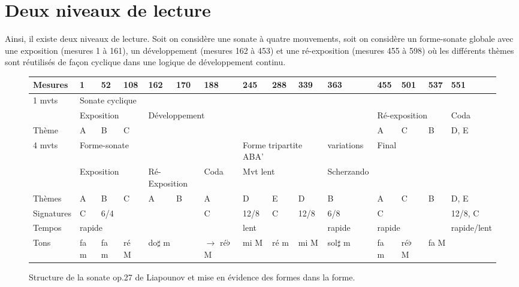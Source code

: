 \section{Deux niveaux de lecture}

Ainsi, il existe deux niveaux de lecture. Soit on considère une sonate à quatre mouvements, soit on considère un forme-sonate globale avec une exposition (mesures 1 à 161), un développement (mesures 162 à 453) et une ré-exposition (mesures 455 à 598) où les différents thèmes sont réutilisés de façon cyclique dans une logique de développement continu.

\begin{figure}[!p]
  \begin{bigcenter}
    \vspace{-1cm}
     {
      \scalebox{0.925} {
\begin{tabular}{|l|l|l|l|l|l|l|l|l|l|l|l|l|l|l|}
 \hline
   Mesures & 1 & 52 & 108 & 162 & 170 & 188 & 245 & 288 & 339 & 363 & 455 & 501 & 537 & 551 \\
 \hline
 \hline
   1 mvts & \multicolumn{14}{|l|}{Sonate cyclique}\\
 \hline
          & \multicolumn{3}{|l|}{Exposition} & \multicolumn{7}{l|}{Développement} & \multicolumn{3}{l|}{Ré-exposition} & Coda\\
 \hline
   Thème & A & B & C & \multicolumn{7}{l|}{} & A & C & B & D, E\\
 \hline
 \hline
   4 mvts & \multicolumn{6}{|l|}{Forme-sonate} & \multicolumn{3}{|l|}{Forme tripartite ABA'} & variations & \multicolumn{4}{|l|}{Final}\\
 \hline
          & \multicolumn{3}{|l|}{Exposition} & \multicolumn{2}{l|}{Ré-Exposition} & Coda & \multicolumn{3}{l|}{Mvt lent} & Scherzando & \multicolumn{4}{l|}{}\\
 \hline
  Thèmes & A & B & C & A & B & A & D & E & D & B & A & C & B & D, E\\
 \hline
 \hline
  Signatures & C & \multicolumn{4}{|l|}{6/4} & C & 12/8 & C & 12/8 & 6/8 & \multicolumn{3}{|l|}{C} & 12/8, C\\
 \hline
  Tempos & \multicolumn{6}{|l|}{rapide} & \multicolumn{3}{|l|}{lent} & rapide & \multicolumn{3}{|l|}{rapide} & rapide/lent\\
 \hline
  Tons & fa m & fa m & ré M & \multicolumn{2}{|l|}{do$\sharp$ m} & $\to$ ré$\flat$ M & mi M & ré m & mi M & sol$\sharp$ m & fa m & ré$\flat$ M & \multicolumn{2}{|l|}{fa M}\\
 \hline
\end{tabular}
      }
    }
  \end{bigcenter}
  \caption{\label{structure}Structure de la sonate op.27 de Liapounov et mise en évidence des formes dans la forme.}
\end{figure}

